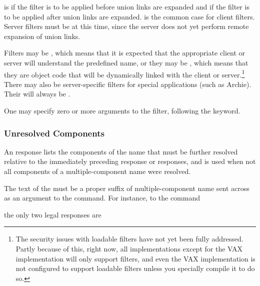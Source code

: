  is  if the filter is to be applied before
union links are expanded and  if the filter is to be applied
after union links are expanded.   is the common case for
client filters.  Server filters must be  at this time, since
the server does not yet perform remote expansion of union links.

Filters may be , which means that it is expected that
the appropriate client or server will understand the predefined name, or
they may be , which means that they are object 
code that will be dynamically linked with the client or
server.\footnote{
 The security issues with loadable filters have
 not yet been fully addressed.  Partly because of this,  right now, all
 implementations except for the VAX implementation will only support
  filters, and even the VAX implementation is not
 configured to support loadable filters unless you specially compile it
 to do so.
}  
There may also be server-specific  filters
for special applications (such as Archie).  Their
 will always be .

One may specify zero or more arguments to the filter, following the
 keyword.

\subsubsection{Unresolved Components}

An  response lists the components of the name that must be
further resolved relative to the immediately preceding 
response or responses, and is used when not all components of a
multiple-component name were resolved. 

\begin{command}
   
\end{command}

The text of the  must be a proper suffix of
multiple-component name sent across as an argument to the 
command.  For instance, to the command 

\begin{command}
\end{command}

the only two legal  responses are 
\begin{command}
   
   
\end{command}

